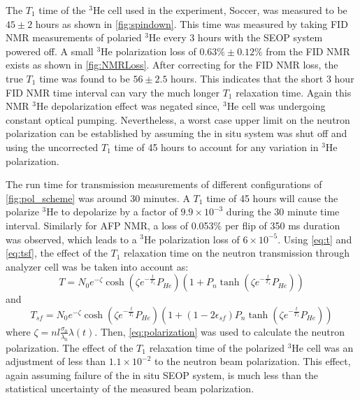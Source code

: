 The $T_1$ time of the $^3$He cell used in the experiment, Soccer, was measured to be $45 \pm 2$ hours as shown in \cref{fig:spindown}. This time was measured by taking FID NMR measurements of polaried $^3$He every 3 hours with the SEOP system powered off. A small $^3$He polarization loss of  $0.63\% \pm 0.12\%$ from the FID NMR exists as shown in \cref{fig:NMRLoss}. After correcting for the FID NMR loss, the true $T_1$ time was found to be $56 \pm 2.5$ hours. This indicates that the short 3 hour FID NMR time interval can vary the much longer $T_1$ relaxation time.  Again this NMR $^3$He depolarization effect was negated since, $^3$He cell was undergoing constant optical pumping. Nevertheless, a worst case upper limit on the neutron polarization can be established by assuming the in situ system was shut off and using the uncorrected $T_1$ time of 45 hours to account for any variation in $^3$He polarization.

The run time for transmission measurements of different configurations of \cref{fig:pol_scheme} was around 30 minutes. A $T_1$ time of 45 hours will cause the polarize $^3$He to depolarize by a factor of $9.9 \times 10^{-3}$ during the 30 minute time interval. Similarly for AFP NMR, a loss of 0.053\% per flip of 350 ms duration was observed, which leads to a $^3$He polarization loss of $6 \times 10^{-5}$. Using \cref{eq:t} and \cref{eq:tsf}, the effect of the $T_1$ relaxation time on the neutron transmission through analyzer cell was be taken into account as:
\begin{equation}
    T = N_0e^{-\zeta}\cosh{\left(\zeta e^{-\frac{t}{T_1}}P_{He}\right)}\left(1+P_n\tanh{\left(\zeta e^{-\frac{t}{T_1}}P_{He}\right)}\right)
\end{equation}
and
\begin{equation}
    T_{sf} = N_0e^{-\zeta}\cosh{\left(\zeta e^{-\frac{t}{T_1}}P_{He}\right)}\left(1+\left(1-2\epsilon_{sf}\right)P_n\tanh{\left(\zeta e^{-\frac{t}{T_1}}P_{He}\right)}\right)
\end{equation}
where $\zeta= nl\frac{\sigma_0}{\lambda_0}\lambda(t)$. Then, \cref{eq:polarization} was used to calculate the neutron polarization. The effect of the $T_1$ relaxation time of the polarized $^3$He cell was an adjustment of less than $1.1 \times 10^{-2}$ to the neutron beam polarization. This effect, again assuming failure of the in situ SEOP system, is much less than the statistical uncertainty of the measured beam polarization.


